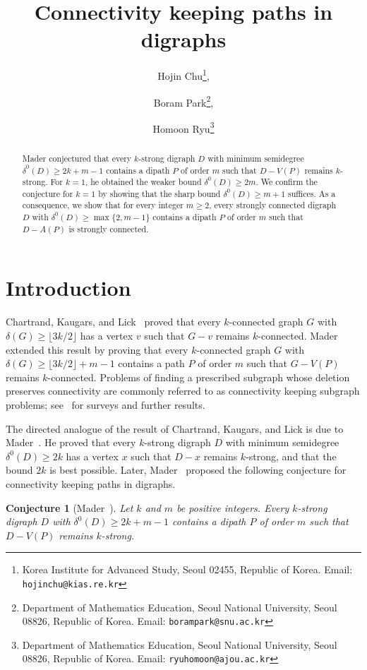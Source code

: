 \documentclass[12pt]{article}
\title{Connectivity keeping paths in digraphs}
\author{Hojin Chu\thanks{Korea Institute for Advanced Study, Seoul 02455, Republic of Korea. Email: {\tt hojinchu@kias.re.kr}},
\and Boram Park\thanks{Department of Mathematics Education, Seoul National University, Seoul 08826, Republic of Korea. Email: {\tt borampark@snu.ac.kr} },
\and Homoon Ryu\thanks{Department of Mathematics Education, Seoul National University, Seoul 08826, Republic of Korea. Email: {\tt ryuhomoon@ajou.ac.kr}}
}
\date{}
\numberwithin{equation}{section}
\theoremstyle{plain}
\newtheorem{conjecture}[theorem]{Conjecture}
\theoremstyle{definition}
\begin{document}
\maketitle

\begin{abstract}
Mader conjectured that every $k$-strong digraph $D$ with minimum semidegree $\delta^0(D)\ge 2k+m-1$ contains a dipath $P$ of order $m$ such that $D-V(P)$ remains $k$-strong.
For $k=1$, he obtained the weaker bound $\delta^0(D)\ge 2m$.
We confirm the conjecture for $k=1$ by showing that the sharp bound $\delta^0(D)\ge m+1$ suffices.
As a consequence, we show that for every integer $m\ge2$, every strongly connected digraph $D$ with $\delta^0(D)\ge\max\{2,m-1\}$ contains a dipath $P$ of order $m$ such that $D-A(P)$ is strongly connected.
\end{abstract}

\section{Introduction}\label{sec:intro}

Chartrand, Kaugars, and Lick~\cite{CKL72} proved that every $k$-connected graph $G$ with $\delta(G)\ge\lfloor 3k/2\rfloor$ has a vertex $v$ such that $G-v$ remains $k$-connected.
Mader~\cite{Mader10} extended this result by proving that every $k$-connected graph $G$ with $\delta(G)\ge\lfloor 3k/2\rfloor+m-1$ contains a path $P$ of order $m$ such that $G-V(P)$ remains $k$-connected.
Problems of finding a prescribed subgraph whose deletion preserves connectivity are commonly referred to as connectivity keeping subgraph problems; see~\cite{Mader05, TM26} for surveys and further results.

The directed analogue of the result of Chartrand, Kaugars, and Lick is due to Mader~\cite{Mader91}.
He proved that every $k$-strong digraph $D$ with minimum semidegree $\delta^0(D)\ge 2k$ has a vertex $x$ such that $D-x$ remains $k$-strong, and that the bound $2k$ is best possible.
Later, Mader~\cite{Mader12} proposed the following conjecture for connectivity keeping paths in digraphs.

\begin{conjecture}[Mader~{\cite[Conjecture~2]{Mader12}}]\label{conj:mader-digraph}
Let $k$ and $m$ be positive integers.
Every $k$-strong digraph $D$ with $\delta^0(D)\ge 2k+m-1$ contains a dipath $P$ of order $m$ such that $D-V(P)$ remains $k$-strong.
\end{conjecture}
\end{document}
